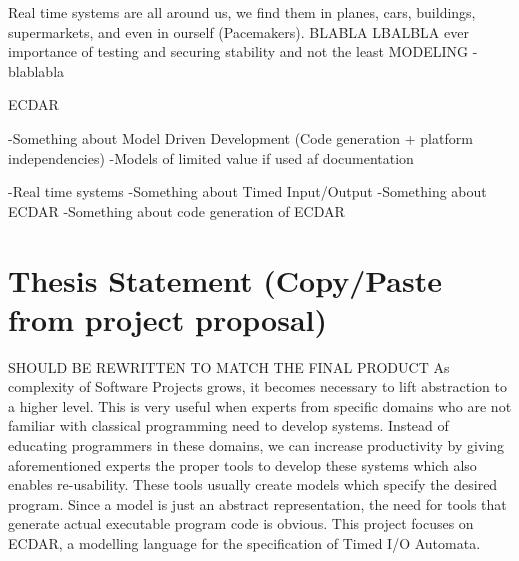 \documentclass{llncs}
\begin{document}
Real time systems are all around us, we find them in planes, cars, buildings, supermarkets, and even in ourself (Pacemakers). BLABLA LBALBLA ever importance of testing and securing stability and not the least MODELING - blablabla

ECDAR

-Something about Model Driven Development (Code generation + platform independencies)\newline
-Models of limited value if used af documentation\newline

-Real time systems\newline
-Something about Timed Input/Output\newline
-Something about ECDAR\newline
-Something about code generation of ECDAR\newline
%

\section{Thesis Statement (Copy/Paste from project proposal)}
%
SHOULD BE REWRITTEN TO MATCH THE FINAL PRODUCT
\newline
As complexity of Software Projects grows, it becomes necessary to lift abstraction to a higher level. This is very useful when experts from specific domains who are not familiar with classical programming need to develop systems. Instead of educating programmers in these domains, we can increase productivity by giving aforementioned experts the proper tools to develop these systems which also enables re-usability.
\newline
These tools usually create models which specify the desired program. Since a model is just an abstract representation, the need for tools that generate actual executable program code is obvious. This project focuses on ECDAR, a modelling language for the specification of Timed I/O Automata.
%
\end{document}

